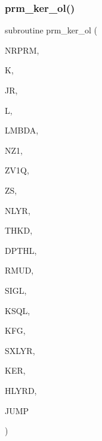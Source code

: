 \subsubsection{\texorpdfstring{prm\+\_\+ker\+\_\+ol()}{prm\_ker\_ol()}}
{\footnotesize\ttfamily subroutine prm\+\_\+ker\+\_\+ol (\begin{DoxyParamCaption}\item[{integer}]{N\+R\+P\+RM,  }\item[{integer}]{K,  }\item[{integer}]{JR,  }\item[{integer}]{L,  }\item[{real(kind=ql)}]{L\+M\+B\+DA,  }\item[{integer}]{N\+Z1,  }\item[{real(kind=ql), dimension(nz1)}]{Z\+V1Q,  }\item[{real(kind=ql)}]{ZS,  }\item[{integer}]{N\+L\+YR,  }\item[{real(kind=ql), dimension (nlyr)}]{T\+H\+KD,  }\item[{real(kind=ql), dimension (nlyr)}]{D\+P\+T\+HL,  }\item[{real(kind=ql), dimension(0\+:nlyr)}]{R\+M\+UD,  }\item[{complex(kind=ql), dimension (nlyr)}]{S\+I\+GL,  }\item[{complex(kind=ql), dimension (nlyr)}]{K\+S\+QL,  }\item[{integer}]{K\+FG,  }\item[{integer}]{S\+X\+L\+YR,  }\item[{complex (kind=ql), dimension(jnlo-\/nrprm\+:jnhi,3,nz1)}]{K\+ER,  }\item[{complex (kind=ql), dimension(nrprm,3,nz1)}]{H\+L\+Y\+RD,  }\item[{logical}]{J\+U\+MP }\end{DoxyParamCaption})}

